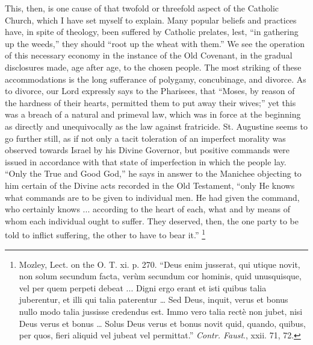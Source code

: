 This, then, is one cause of that twofold or threefold aspect of the
Catholic Church, which I have set myself to explain. Many popular
beliefs and practices have, in spite of theology, been suffered by
Catholic prelates, lest, ``in gathering up the weeds,''
they should ``root up the wheat with them.'' We see the
operation of this necessary economy in the instance of the Old
Covenant, in the gradual disclosures made, age after age, to the
chosen people. The most striking of these accommodations is the long
sufferance of polygamy, concubinage, and divorce. As to divorce, our
Lord expressly says to the Pharisees, that ``Moses, by reason of
the hardness of their hearts, permitted them to put away their
wives;'' yet this was a breach of a natural and primeval law,
which was in force at the beginning as directly and unequivocally as
the law against fratricide. St. Augustine seems to go further still,
as if not only a tacit toleration of an imperfect morality was
observed towards Israel by his Divine Governor, but positive commands
were issued in accordance with that state of imperfection in which the
people lay. ``Only the True and Good God,'' he says in answer
to the Manichee objecting to him certain of the Divine acts recorded
in the Old Testament, ``only He knows what commands are to be
given to individual men. He had given the command, who certainly knows
... according to the heart of each, what and by means of whom each
individual ought to suffer. They deserved, then, the one party to be
told to inflict suffering, the other to have to bear it.'' \footnote{Mozley, Lect. on the O. T. xi. p. 270.
``Deus enim jusserat, qui utique novit, non solum secundum facta,
verùm secundum cor hominis, quid unusquisque, vel per quem perpeti
debeat ... Digni ergo erant et isti quibus talia juberentur, et illi
qui talia paterentur … Sed Deus, inquit, verus et bonus nullo modo
talia jussisse credendus est. Immo vero talia rectè non jubet, nisi
Deus verus et bonus … Solus Deus verus et bonus novit quid, quando,
quibus, per quos, fieri aliquid vel jubeat vel permittat.'' \emph{Contr.
Faust}., xxii. 71, 72.}

